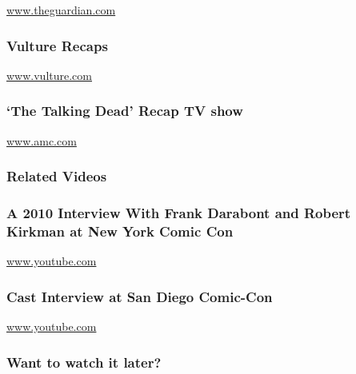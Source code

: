 \href{http://www.theguardian.com}{www.theguardian.com}

\href{http://www.vulture.com/tv/the-walking-dead/}{}

\hypertarget{vulture-recaps}{%
\subsubsection{Vulture Recaps}\label{vulture-recaps}}

\href{http://www.vulture.com}{www.vulture.com}

\href{http://www.amc.com/shows/talking-dead}{}

\hypertarget{the-talking-dead-recap-tv-show}{%
\subsubsection{`The Talking Dead' Recap TV
show}\label{the-talking-dead-recap-tv-show}}

\href{http://www.amc.com}{www.amc.com}

\hypertarget{related-videos}{%
\subsubsection{Related Videos}\label{related-videos}}

\href{https://www.youtube.com/watch?v=SGRWXfnU2lY}{}

\hypertarget{a-2010-interview-with-frank-darabont-and-robert-kirkman-at-new-york-comic-con}{%
\subsubsection{A 2010 Interview With Frank Darabont and Robert Kirkman
at New York Comic
Con}\label{a-2010-interview-with-frank-darabont-and-robert-kirkman-at-new-york-comic-con}}

\href{http://www.youtube.com}{www.youtube.com}

\href{https://www.youtube.com/watch?v=DrFb0uahbXU}{}

\hypertarget{cast-interview-at-san-diego-comic-con}{%
\subsubsection{Cast Interview at San Diego
Comic-Con}\label{cast-interview-at-san-diego-comic-con}}

\href{http://www.youtube.com}{www.youtube.com}

\hypertarget{want-to-watch-it-later}{%
\subsubsection{Want to watch it later?}\label{want-to-watch-it-later}}

